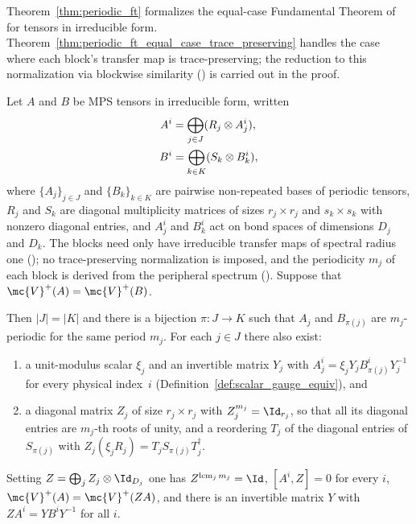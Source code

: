Theorem~\ref{thm:periodic_ft} formalizes the equal-case Fundamental Theorem of
\cite[lines~643--656]{DeLasCuevas2017Irreducible} for tensors in
irreducible form. Theorem~\ref{thm:periodic_ft_equal_case_trace_preserving}
handles the case where each block's transfer map is trace-preserving; the
reduction to this normalization via blockwise similarity (\cite[eq.~\emph{unital},
    line~316]{DeLasCuevas2017Irreducible}) is carried out in the proof.

\begin{theorem}
    \label{thm:periodic_ft}
    \leanok
    Let $A$ and $B$ be MPS tensors in irreducible form, written
    \begin{align}
        A^i & =\bigoplus_{j\in J}(R_j\otimes A_j^i), \notag \\
        B^i & =\bigoplus_{k\in K}(S_k\otimes B_k^i), \notag
    \end{align}
    where $\{A_j\}_{j \in J}$ and $\{B_k\}_{k \in K}$ are pairwise
    non-repeated bases of periodic tensors, $R_j$ and $S_k$ are diagonal
    multiplicity matrices of sizes $r_j\times r_j$ and $s_k\times s_k$ with
    nonzero diagonal entries, and $A_j^i$ and $B_k^i$ act on bond spaces of
    dimensions $D_j$ and $D_k$. The blocks need only have irreducible transfer
    maps of spectral radius one
    (\cite[lines~248--261]{DeLasCuevas2017Irreducible}); no trace-preserving
    normalization is imposed, and the periodicity $m_j$ of each block is
    derived from the peripheral spectrum
    (\cite[lines~257--258]{DeLasCuevas2017Irreducible}).
    Suppose that $\mc{V}^+(A)=\mc{V}^+(B)$.

    Then $|J|=|K|$ and there is a bijection $\pi:J\to K$
    such that $A_j$ and $B_{\pi(j)}$ are $m_j$-periodic for the same
    period $m_j$.
    For each $j\in J$ there also exist:
    \begin{enumerate}
        \item a unit-modulus scalar $\xi_j$ and an invertible matrix $Y_j$
              with $A_j^i=\xi_jY_jB_{\pi(j)}^iY_j^{-1}$ for every physical
              index~$i$ (Definition~\ref{def:scalar_gauge_equiv}), and
        \item a diagonal matrix $Z_j$ of size $r_j\times r_j$ with
              $Z_j^{m_j}=\Id_{r_j}$, so that all its diagonal entries are
              $m_j$-th roots of unity, and a reordering $T_j$ of the diagonal
              entries of $S_{\pi(j)}$ with
              $Z_j\left(\xi_jR_j\right)=T_jS_{\pi(j)}T_j^\dagger$.
    \end{enumerate}
    Setting $Z=\bigoplus_j Z_j\otimes\Id_{D_j}$ one has
    $Z^{\operatorname{lcm}_jm_j}=\Id$, $[A^i,Z]=0$ for every $i$,
    $\mc{V}^+(A)=\mc{V}^+(ZA)$, and there is an invertible matrix $Y$ with
    $ZA^i=YB^iY^{-1}$ for all $i$.

\end{theorem}

